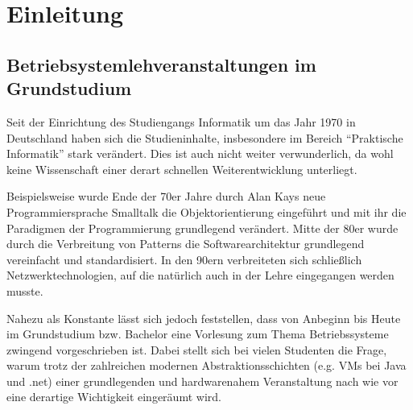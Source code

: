 \chapter{Einleitung}
\label{chap:introduction}


\section{Betriebsystemlehveranstaltungen im Grundstudium}
\label{sec:motivation}

		Seit der Einrichtung des Studiengangs Informatik um das Jahr 1970 in Deutschland haben sich die Studieninhalte, insbesondere im Bereich "`Praktische Informatik"' stark verändert.
		Dies ist auch nicht weiter verwunderlich, da wohl keine Wissenschaft einer derart schnellen Weiterentwicklung unterliegt.

		Beispielsweise wurde Ende der 70er Jahre durch Alan Kays neue Programmiersprache Smalltalk die Objektorientierung eingeführt und mit ihr die Paradigmen der Programmierung grundlegend verändert.
		Mitte der 80er wurde durch die Verbreitung von Patterns die Softwarearchitektur grundlegend vereinfacht und standardisiert.
		In den 90ern verbreiteten sich schließlich Netzwerktechnologien, auf die natürlich auch in der Lehre eingegangen werden musste.

		Nahezu als Konstante lässt sich jedoch feststellen, dass von Anbeginn bis Heute im Grundstudium bzw. Bachelor eine Vorlesung zum Thema Betriebssysteme zwingend vorgeschrieben ist.
		Dabei stellt sich bei vielen Studenten die Frage, warum trotz der zahlreichen modernen Abstraktionsschichten (e.g. VMs bei Java und .net) einer grundlegenden und hardwarenahem Veranstaltung nach wie vor eine derartige Wichtigkeit eingeräumt wird.


